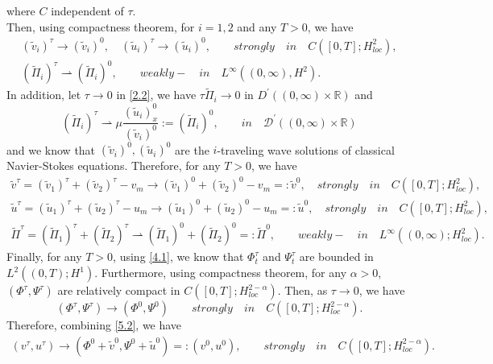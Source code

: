 \documentclass[10pt,reqno]{amsart}
\numberwithin{equation}{section}
\begin{document}
where $C$ independent of $\tau$.\\
Then, using compactness theorem, for $i=1,2$ and any $T>0$, we have
\[
\begin{aligned}
(\widetilde v_i)^{\tau}\rightarrow(\widetilde v_i)^0,\quad(\widetilde u_i)^{\tau}\rightarrow(\widetilde u_i)^0,\qquad strongly\quad in \quad C([0,T]; H_{loc}^2),\\
(\widetilde \Pi_i)^{\tau}\rightharpoonup(\widetilde \Pi_i)^0,\qquad weakly-\quad in \quad L^\infty((0,\infty), H^2).
\end{aligned}
\]
In addition, let $\tau\rightarrow0$ in \eqref{2.2}, we have $\tau \widetilde \Pi_i\rightarrow 0$ in $D^\prime((0,\infty)\times \mathbb R)$ and
\[
(\widetilde \Pi_i)^{\tau}\rightharpoonup\mu\frac{(\widetilde u_i)_{x}^0}{(\widetilde v_i)^0}:=(\widetilde \Pi_i)^{0},\qquad  in \quad \mathcal D^\prime((0,\infty)\times \mathbb R)
\]
and we know that $(\widetilde v_i)^0,(\widetilde u_i)^0$ are the $i$-traveling wave solutions of classical Navier-Stokes equations.
Therefore,  for any $T>0$, we have
\begin{equation}\label{5.2}
\begin{aligned}
\widetilde v^{\tau}=(\widetilde v_1)^{\tau}+(\widetilde v_2)^{\tau}-v_m\rightarrow(\widetilde v_1)^{0}+(\widetilde v_2)^{0}-v_m=:\widetilde v^{0}, \quad strongly\quad in \quad C([0, T]; H_{loc}^2),\\
 \widetilde u^{\tau}=(\widetilde u_1)^{\tau}+(\widetilde u_2)^{\tau}-u_m\rightarrow(\widetilde u_1)^{0}+(\widetilde u_2)^{0}-u_m=:\widetilde u^{0}, \quad strongly\quad in \quad C([0, T]; H_{loc}^2),\\
  \widetilde \Pi^{\tau}=(\widetilde \Pi_1)^{\tau}+(\widetilde \Pi_2)^{\tau}\rightharpoonup(\widetilde \Pi_1)^{0}+(\widetilde \Pi_2)^{0}=:\widetilde \Pi^{0},\qquad weakly- \quad in \quad L^\infty((0, \infty); H_{loc}^2).
\end{aligned}
\end{equation}
Finally, for any $T>0$, using \eqref{4.1}, we know that $\Phi_t^{\tau}$ and $\Psi_t^{\tau}$ are bounded in $L^2((0,T);H^1)$. Furthermore, using compactness theorem, for any $\alpha>0$, $(\Phi^{\tau},\Psi^{\tau})$ are relatively compact in $C([0,T];H_{loc}^{2-\alpha})$. Then, as $\tau\rightarrow0$, we have
\[
(\Phi^{\tau},\Psi^{\tau})\rightarrow(\Phi^0, \Psi^0)\qquad strongly\quad in \quad C([0,T];H_{loc}^{2-\alpha}).
\]
Therefore, combining \eqref{5.2}, we have
\begin{align}\label{5.3}
(v^{\tau},u^{\tau})\rightarrow(\Phi^0+\widetilde v^{0}, \Psi^0+\widetilde u^{0})
=:(v^0, u^0),
\qquad strongly\quad in \quad C([0,T];H_{loc}^{2-\alpha}).
\end{align}
\end{document}

